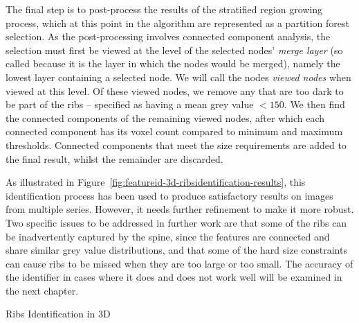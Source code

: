 The final step is to post-process the results of the stratified region growing process, which at this point in the algorithm are represented as a partition forest selection. As the post-processing involves connected component analysis, the selection must first be viewed at the level of the selected nodes' \emph{merge layer} (so called because it is the layer in which the nodes would be merged), namely the lowest layer containing a selected node. We will call the nodes \emph{viewed nodes} when viewed at this level. Of these viewed nodes, we remove any that are too dark to be part of the ribs -- specified as having a mean grey value $< 150$. We then find the connected components of the remaining viewed nodes, after which each connected component has its voxel count compared to minimum and maximum thresholds. Connected components that meet the size requirements are added to the final result, whilst the remainder are discarded.

As illustrated in Figure~\ref{fig:featureid-3d-ribsidentification-results}, this identification process has been used to produce satisfactory results on images from multiple series. However, it needs further refinement to make it more robust. Two specific issues to be addressed in further work are that some of the ribs can be inadvertently captured by the spine, since the features are connected and share similar grey value distributions, and that some of the hard size constraints can cause ribs to be missed when they are too large or too small. The accuracy of the identifier in cases where it does and does not work well will be examined in the next chapter.

\begin{stulisting}[p]
\caption{Ribs Identification in 3D}
\label{code:featureid-3d-ribsidentification}

\end{stulisting}

